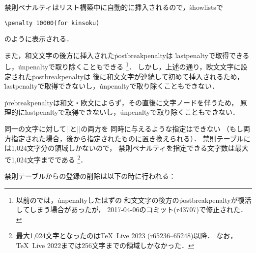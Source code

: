 \documentclass[a4paper,11pt,nomag,dvipdfmx]{jsarticle}
\begin{document}
\begin{dangerous}
禁則ペナルティはリスト構築中に自動的に挿入されるので，\.{showlists}で
\begin{verbatim}
\penalty 10000(for kinsoku)
\end{verbatim}
のように表示される．

また，和文文字の後方に挿入された\.{postbreakpenalty}は
\.{lastpenalty}で取得できるし，\.{unpenalty}で取り除くこともできる
\footnote{以前の\pTeX では，\.{unpenalty}したはずの
和文文字の後方の\.{postbreakpenalty}が復活してしまう場合があったが，
2017-04-06のコミット(r43707)で修正された\cite{tjb11}．}．
しかし，上述の通り，欧文文字に設定された\.{postbreakpenalty}は
後に和文文字が連続して初めて挿入されるため，
\.{lastpenalty}で取得できないし，\.{unpenalty}で取り除くこともできない．

\.{prebreakpenalty}は和文・欧文によらず，その直後に文字ノードを伴うため，
原理的に\.{lastpenalty}で取得できないし，\.{unpenalty}で取り除くこともできない．
\end{dangerous}

同一の文字に対して|\prebreakpenalty|と|\postbreakpenalty|の両方を
同時に与えるような指定はできない
（もし両方指定された場合，後から指定されたものに置き換えられる）．
禁則テーブルには1,024文字分の領域しかないので，
禁則ペナルティを指定できる文字数は最大で1,024文字までである
\footnote{最大1,024文字となったのは\TeX~Live 2023 (r65236--65248)以降．
なお，\TeX~Live 2022までは256文字までの領域しかなかった．}．

禁則テーブルからの登録の削除は以下の時に行われる\cite{tjb26,tjb57}：
\end{document}
